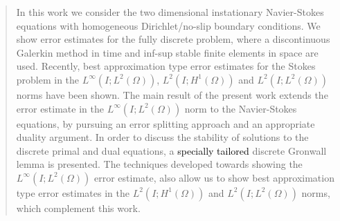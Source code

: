 \documentclass{m2an}
\newcommand\blue[1]{\textcolor{black}{#1}}
\begin{document}
\author{Boris Vexler}\address{Chair of Optimal Control, Technical University of Munich,
  School of Computation Information and Technology,
Department of Mathematics , Boltzmannstra{\ss}e 3, 85748 Garching b. Munich, Germany
(vexler@tum.de).}
\author{Jakob Wagner}\address{Chair of Optimal Control, Technical University of Munich,
  School of Computation Information and Technology,
Department of Mathematics , Boltzmannstra{\ss}e 3, 85748 Garching b. Munich, Germany
(wagnerja@cit.tum.de) ORCID: \url{https://orcid.org/0000-0001-8510-9790}.}


\begin{abstract}
In this work we consider the two dimensional instationary Navier-Stokes equations
with homogeneous Dirichlet/no-slip boundary conditions.
We show error estimates for the fully discrete problem, where a discontinuous Galerkin method in time
and inf-sup stable finite elements in space are used.
% 
% 
% 
Recently, best approximation type error estimates for the Stokes problem in the $L^\infty(I;L^2(\Omega))$, 
$L^2(I;H^1(\Omega))$ and $L^2(I;L^2(\Omega))$ norms have been shown.
The main result of the present work extends the error estimate in the $L^\infty(I;L^2(\Omega))$ norm 
to the Navier-Stokes equations, by pursuing an error splitting approach and an appropriate duality argument.
In order to discuss the stability of solutions to the discrete primal and dual equations,
a \blue{specially tailored} discrete Gronwall lemma is presented.
The techniques developed towards showing the $L^\infty(I;L^2(\Omega))$
error estimate, also allow us to show best approximation 
type error estimates in the $L^2(I;H^1(\Omega))$ and $L^2(I;L^2(\Omega))$ norms, which complement this work.


\end{abstract}
\end{document}
